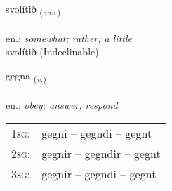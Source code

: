 \documentclass[frontgrid, backgrid]{flacards}\usepackage[]{graphicx}\usepackage[]{xcolor}
\begin{document}

\renewcommand{\flhead}{\vskip5pt \fboxsep=0pt {\small\bfseries\footnotesize Atviksorð | Adverb}}
\renewcommand{\fcfoot}{\vskip5pt \fboxsep=0pt \hspace{2pt}{\small\bfseries\footnotesize 1K}}

\renewcommand{\blhead}{\vskip5pt {\small\bfseries\footnotesize Atviksorð | Adverb }}
\renewcommand{\bcfoot}{\vskip5pt \hspace{2pt}{\small\bfseries\footnotesize 1K}}


{svolítið \small{\textsubscript{(\textit{adv.})}} \\[1ex]
\textphonetic{[svɔːlitɪð]} \\
en.: \emph{somewhat; rather; a little} \\  [2ex]
svolítið (Indeclinable)}

\renewcommand{\flhead}{\vskip5pt \fboxsep=0pt {\small\bfseries\footnotesize Sagnorð | Verb}}
\renewcommand{\fcfoot}{\vskip5pt \fboxsep=0pt \hspace{2pt}{\small\bfseries\footnotesize 1K}}

\renewcommand{\blhead}{\vskip5pt {\small\bfseries\footnotesize Sagnorð | Verb }}
\renewcommand{\bcfoot}{\vskip5pt \hspace{2pt}{\small\bfseries\footnotesize 1K}}


{gegna \small{\textsubscript{(\textit{v.})}} \\[1ex] %
\textphonetic{[cɛkna]} \\
en.: \emph{obey; answer, respond} \\  [2ex]
\renewcommand*{\arraystretch}{0.8}
\begin{tabular}{p{1cm}l}
\textsc{1sg}: & gegni -- gegndi -- gegnt \\ 
\textsc{2sg}: & gegnir -- gegndir -- gegnt \\ 
\textsc{3sg}: & gegnir -- gegndi -- gegnt \\ 
\end{tabular}
}
\end{document}
